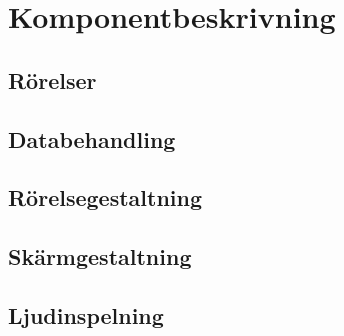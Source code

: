 \section{Komponentbeskrivning}

\subsection{Rörelser}


\subsection{Databehandling}
\label{sub:dataprocessing}


\subsection{Rörelsegestaltning}
\label{sub:touchmedia}


\subsection{Skärmgestaltning}
\label{sub:screenmedia}


\subsection{Ljudinspelning}

